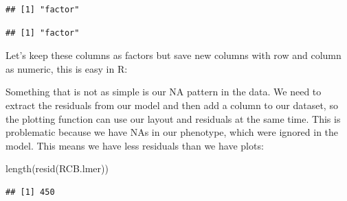 \documentclass[
]{book}
\newenvironment{Shaded}{\begin{snugshade}}{\end{snugshade}}
\newcommand{\FunctionTok}[1]{\textcolor[rgb]{0.00,0.00,0.00}{#1}}
\newcommand{\NormalTok}[1]{#1}
\newcommand{\OtherTok}[1]{\textcolor[rgb]{0.56,0.35,0.01}{#1}}
\newcommand{\SpecialCharTok}[1]{\textcolor[rgb]{0.00,0.00,0.00}{#1}}
\begin{document}
\begin{Shaded}
\end{Shaded}

\begin{verbatim}
## [1] "factor"
\end{verbatim}

\begin{Shaded}
\end{Shaded}

\begin{verbatim}
## [1] "factor"
\end{verbatim}

Let's keep these columns as factors but save new columns with row and column as numeric, this is easy in R:

\begin{Shaded}
\end{Shaded}

Something that is not as simple is our NA pattern in the data. We need to extract the residuals from our model and then add a column to our dataset, so the plotting function can use our layout and residuals at the same time. This is problematic because we have NAs in our phenotype, which were ignored in the model. This means we have less residuals than we have plots:

\begin{Shaded}
\begin{Highlighting}[]
\FunctionTok{length}\NormalTok{(}\FunctionTok{resid}\NormalTok{(RCB.lmer))}
\end{Highlighting}
\end{Shaded}

\begin{verbatim}
## [1] 450
\end{verbatim}
\end{document}
